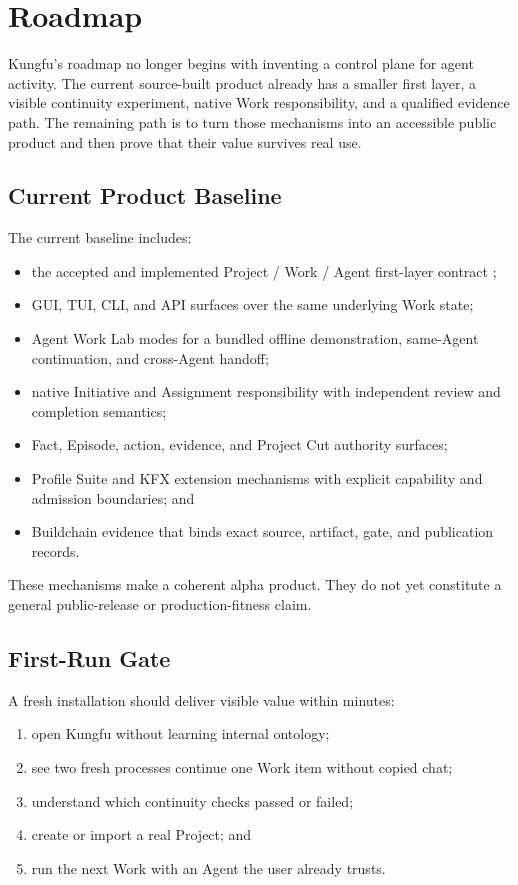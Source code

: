 \section{Roadmap}

Kungfu's roadmap no longer begins with inventing a control plane for agent
activity. The current source-built product already has a smaller first layer,
a visible continuity experiment, native Work responsibility, and a qualified
evidence path. The remaining path is to turn those mechanisms into an
accessible public product and then prove that their value survives real use.

\subsection{Current Product Baseline}

The current baseline includes:

\begin{itemize}[leftmargin=*]
  \item the accepted and implemented Project / Work / Agent first-layer
  contract \cite{projectWorkAgent};
  \item GUI, TUI, CLI, and API surfaces over the same underlying Work state;
  \item Agent Work Lab modes for a bundled offline demonstration, same-Agent
  continuation, and cross-Agent handoff;
  \item native Initiative and Assignment responsibility with independent
  review and completion semantics;
  \item Fact, Episode, action, evidence, and Project Cut authority surfaces;
  \item Profile Suite and KFX extension mechanisms with explicit capability
  and admission boundaries; and
  \item Buildchain evidence that binds exact source, artifact, gate, and
  publication records.
\end{itemize}

These mechanisms make a coherent alpha product. They do not yet constitute a
general public-release or production-fitness claim.

\subsection{First-Run Gate}

A fresh installation should deliver visible value within minutes:

\begin{enumerate}[leftmargin=*]
  \item open Kungfu without learning internal ontology;
  \item see two fresh processes continue one Work item without copied chat;
  \item understand which continuity checks passed or failed;
  \item create or import a real Project; and
  \item run the next Work with an Agent the user already trusts.
\end{enumerate}

